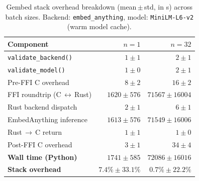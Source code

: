 \begin{table}[t]
  \centering
  \small
  \caption{Gembed stack overhead breakdown (mean\,$\pm$\,std, in \textmu{}s)           across batch sizes. Backend: \texttt{embed\_anything},           model: \texttt{MiniLM\mbox{-}L6\mbox{-}v2} (warm model cache).}
  \label{tab:gembed_overhead}
  \begin{tabular}{lrr}
    \toprule
    \textbf{Component} & $n=1$ & $n=32$ \\
    \midrule
    \texttt{validate\_backend()} & $1\pm1$ & $2\pm1$ \\
    \texttt{validate\_model()} & $1\pm0$ & $2\pm1$ \\
    Pre-FFI C overhead & $8\pm2$ & $16\pm2$ \\
    FFI roundtrip (C\,$\leftrightarrow$\,Rust) & $1620\pm576$ & $71567\pm16004$ \\
    Rust backend dispatch & $2\pm1$ & $6\pm1$ \\
    EmbedAnything inference & $1613\pm576$ & $71549\pm16006$ \\
    Rust\,$\to$\,C return & $1\pm1$ & $1\pm0$ \\
    Post-FFI C overhead & $3\pm1$ & $34\pm4$ \\
    \midrule
    \textbf{Wall time (Python)} & $1741\pm585$ & $72086\pm16016$ \\
    \midrule
    \textbf{Stack overhead} & $7.4\%\pm33.1\%$ & $0.7\%\pm22.2\%$ \\
    \bottomrule
  \end{tabular}
\end{table}
